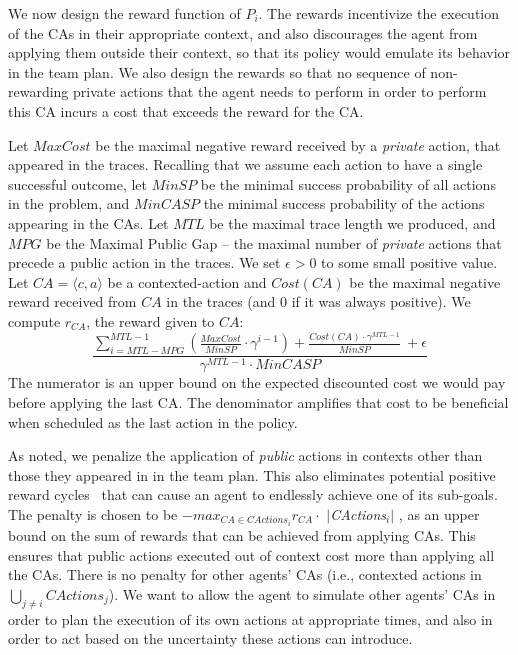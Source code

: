 \documentclass[letterpaper]{article} %
\theoremstyle{definition}
\newcommand{\cact}[1]{{\em CActions$_#1$}}
\newcommand{\mcact}[1]{{\mathit{CActions}_#1}}
\begin{document}
We now design the reward function of $P_i$. The rewards incentivize the execution of the CAs in their appropriate context, and also discourages the agent from applying them outside their context, so that its policy would emulate its behavior in the team plan. 
We also design the rewards so that no sequence of non-rewarding private actions that the agent needs to perform in order to perform this CA incurs a cost that exceeds the reward for the CA.



Let $MaxCost$ be the maximal negative reward received by a \emph{private} action, that appeared in the traces.
Recalling that we assume each action to have a single successful outcome, let $MinSP$ be the minimal success probability of all actions in the problem, and $MinCASP$ the minimal success probability of the actions appearing in the CAs. Let $MTL$ be the maximal trace length we produced, and $MPG$ be the Maximal Public Gap -- the maximal number of \emph{private} actions that precede a public action in the traces. We set $\epsilon > 0$ to some small positive value.
Let $CA=\langle c, a \rangle$ be a contexted-action and $Cost(CA)$ be the maximal negative reward received from $CA$ in the traces (and 0 if it was always positive). We compute $r_{CA}$, the reward given to $CA$:
\begin{equation*}
\label{eqn:rq}
   \frac{\sum_{i=MTL - MPG}^{MTL-1}(\frac{MaxCost}{MinSP} \cdot \gamma^{i-1})+ \frac{Cost(CA) \cdot \gamma^{MTL-1}}{MinSP} \ +\epsilon}{\gamma^{MTL-1}\cdot MinCASP} 
\end{equation*}%
The numerator is an upper bound on the expected discounted cost we would pay before applying the last CA. The denominator amplifies that cost to be beneficial when scheduled as the last action in the policy.


As noted, we penalize the application of \emph{public} actions in contexts other
than those they appeared in in the team plan. This also eliminates 
potential positive reward cycles~\cite{RLCYCLES} that can cause an agent to endlessly achieve one of its sub-goals. 
The penalty is chosen to be $-max_{CA \in \mcact{i}}r_{CA} \cdot$ $|$\cact{i}$|$
, as an upper bound on the sum of rewards that can be achieved from applying CAs. This ensures that public actions executed out of context cost more than applying all the CAs. There is no penalty for other agents' CAs
(i.e., contexted actions in $\bigcup_{j\neq i} \mcact{j}$). We want
to allow the agent to simulate other agents' CAs in order to plan the execution of its own actions at appropriate times, and also in order to act based on the uncertainty these actions can introduce.
\end{document}
